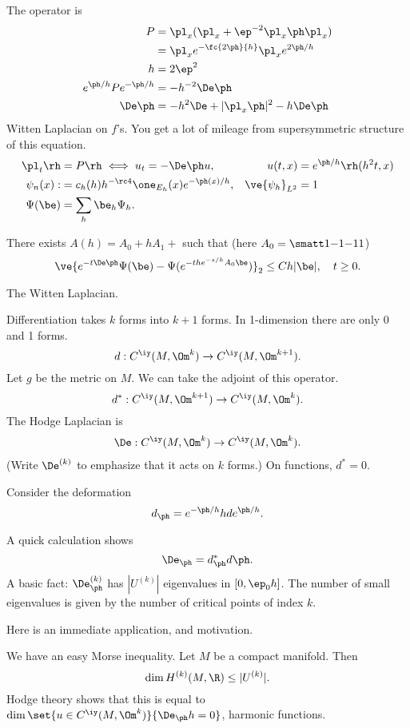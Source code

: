 The operator is
\begin{align}
P &= \pl_x(\pl_x + \ep^{-2} \pl_x\ph\pl_x)\\
&= \pl_x e^{-\fc{2\ph}{h}}\pl_x e^{2\ph/h}\\
h&=2\ep^2\\
e^{\ph/h} P e^{-\ph/h}&=-h^{-2}\De \ph\\
\De \ph&=-h^2\De + |\pl_x \ph|^2 - h\De \ph
\end{align}
Witten Laplacian on $f$'s. 
You get a lot of mileage from supersymmetric structure of this equation.
\begin{align}
\pl_t\rh &= P \rh\iff u_t = -\De \ph u, &u(t,x) &= e^{\ph/h} \rh(h^2 t,x)\\
\psi_n(x):&= c_h(h) h^{-\rc 4} \one_{E_h}(x) e^{-\ph(x)/h}, & \ve{\psi_h}_{L^2}&=1\\
\Psi(\be) &= \sum_h \be_h \Psi_h.
\end{align}
\begin{thm}
There exists $A(h)=A_0+hA_1+$ such that (here $A_0=\smatt 1{-1}{-1}1$)
$$
\ve{e^{-t\De\ph} \Psi(\be) - \Psi(e^{-t he^{-s/h} A_0\be})}_2\le Ch |\be|,\quad t\ge 0.
$$
\end{thm}

The Witten Laplacian. 

Differentiation takes $k$ forms into $k+1$ forms. In 1-dimension there are only 0 and 1 forms.
$$
d:C^\iy (M,\Om^k) \to C^\iy(M, \Om^{k+1}).
$$
Let $g$ be the metric on $M$. 
We can take the adjoint of this operator.
$$
d^* : C^\iy(M, \Om^{k+1}) \to C^{\iy} (M,\Om^k).
$$
The Hodge Laplacian is
\begin{align}
\De: C^\iy(M, \Om^k) \to C^\iy(M,\Om^k).
\end{align}
(Write $\De^{(k)}$ to emphasize that it acts on $k$ forms.)
On functions, $d^*=0$. 

Consider the deformation
$$
d_\ph = e^{-\ph/h} h d e^{\ph/h}.
$$

A quick calculation shows
$$
\De_\ph = d_\ph^* d\ph.
$$
A basic fact: $\De_\ph^{(k)}$ has $|U^{(k)}|$ eigenvalues in $[0,\ep_0h]$. The number of small eigenvalues is given by the number of critical points of index $k$.

Here is an immediate application, and motivation. 

We have an easy Morse inequality. Let $M$ be a compact manifold. Then
$$
\dim H^{(k)}(M, \R)\le |U^{(k)}|.
$$
Hodge theory shows that this is equal to $\dim\set{u\in C^\iy(M,\Om^k)}{\De_\ph h=0}$, harmonic functions. 

